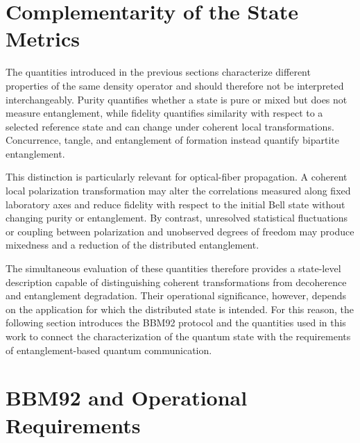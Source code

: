 
\section{Complementarity of the State Metrics}
\label{sec:complementarity_state_metrics}

The quantities introduced in the previous sections characterize different
properties of the same density operator and should therefore not be interpreted
interchangeably. Purity quantifies whether a state is pure or mixed but does not
measure entanglement, while fidelity quantifies similarity with respect to a
selected reference state and can change under coherent local transformations.
Concurrence, tangle, and entanglement of formation instead quantify bipartite
entanglement.

This distinction is particularly relevant for optical-fiber propagation. A
coherent local polarization transformation may alter the correlations measured
along fixed laboratory axes and reduce fidelity with respect to the initial Bell
state without changing purity or entanglement. By contrast, unresolved
statistical fluctuations or coupling between polarization and unobserved degrees
of freedom may produce mixedness and a reduction of the distributed
entanglement.

The simultaneous evaluation of these quantities therefore provides a
state-level description capable of distinguishing coherent transformations from
decoherence and entanglement degradation. Their operational significance,
however, depends on the application for which the distributed state is intended.
For this reason, the following section introduces the BBM92 protocol and the
quantities used in this work to connect the characterization of the quantum state
with the requirements of entanglement-based quantum communication.


\section{BBM92 and Operational Requirements}

\label{sec:bbm92_operational_requirements}

